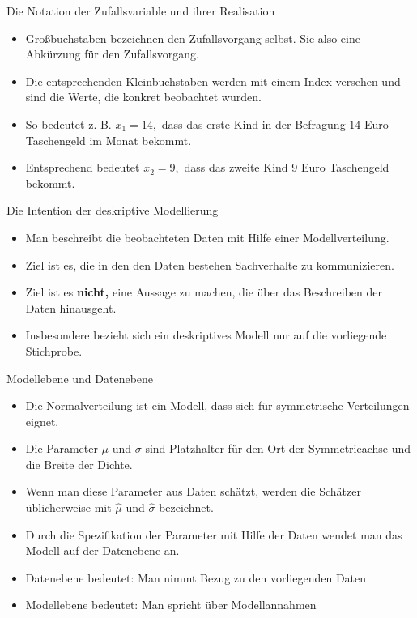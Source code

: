 \documentclass[usenames,dvipsnames,handout]{beamer}
\begin{document}
\begin{frame}{Die Notation der Zufallsvariable und ihrer Realisation}
\begin{itemize}
\item{Großbuchstaben bezeichnen  den Zufallsvorgang selbst. Sie also eine Abkürzung
für den Zufallsvorgang. }
\item{Die entsprechenden Kleinbuchstaben werden mit einem Index versehen und sind die Werte,
die konkret beobachtet wurden.}
\item{So bedeutet z. B. $x_{1}=14,$ dass das erste Kind in der Befragung $14$ Euro Taschengeld
im Monat bekommt.}
\item{Entsprechend bedeutet $x_{2}=9,$ dass das zweite Kind $9$ Euro Taschengeld bekommt.}
\end{itemize}
\end{frame}



\begin{frame}{Die Intention der deskriptive Modellierung}

\begin{itemize}
\item{Man beschreibt die beobachteten Daten mit Hilfe einer Modellverteilung.}\pause
\item{Ziel ist es, die in den den Daten bestehen Sachverhalte zu kommunizieren.}\pause
\item{Ziel ist es \textbf{nicht,} eine Aussage zu machen, die über das Beschreiben der Daten
hinausgeht.}\pause
\item{Insbesondere bezieht sich ein deskriptives Modell nur auf die vorliegende Stichprobe.}
\end{itemize}

\end{frame}

\begin{frame}{Modellebene und Datenebene}

\begin{itemize}
\item{Die Normalverteilung ist ein Modell, dass sich für symmetrische
Verteilungen eignet.}\pause
\item{Die Parameter $\mu$ und $\sigma$ sind Platzhalter
für den Ort der Symmetrieachse und die Breite der Dichte.}\pause
\item{Wenn man diese Parameter aus Daten schätzt,
werden die Schätzer üblicherweise mit $\hat{\mu}$
und $\hat{\sigma}$ bezeichnet.}\pause
\item{Durch die  Spezifikation der Parameter mit Hilfe der
Daten wendet man das Modell auf der Datenebene an.}\pause
\item{Datenebene bedeutet: Man nimmt Bezug zu den vorliegenden Daten}
\item{Modellebene bedeutet: Man spricht über Modellannahmen}
\end{itemize}
\end{frame}
\end{document}
